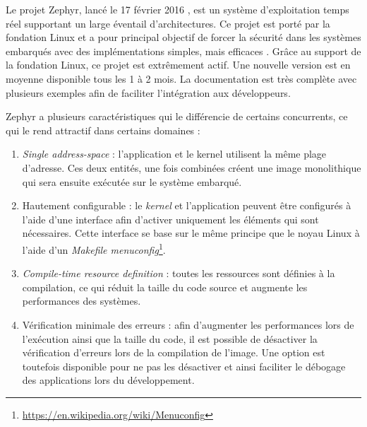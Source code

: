Le projet Zephyr, lancé le 17 février 2016 \cite{Zephyrop38:online}, est un système d'exploitation temps réel supportant un large éventail d'architectures. Ce projet est porté par la fondation Linux et a pour principal objectif de forcer la sécurité dans les systèmes embarqués avec des implémentations simples, mais efficaces \cite{Zephyrop38:online}. Grâce au support de la fondation Linux, ce projet est extrêmement actif. Une nouvelle version est en moyenne disponible tous les 1 à 2 mois. La documentation est très complète avec plusieurs exemples afin de faciliter l'intégration aux développeurs.

Zephyr a plusieurs caractéristiques qui le différencie de certains concurrents, ce qui le rend attractif dans certains domaines : 
\begin{enumerate}
    \item \textit{Single address-space} : l'application et le kernel utilisent la même plage d'adresse. Ces deux entités, une fois combinées créent une image monolithique qui sera ensuite exécutée sur le système embarqué.
    
    \item Hautement configurable : le \textit{kernel} et l'application peuvent être configurés à l'aide d'une interface afin d'activer uniquement les éléments qui sont nécessaires. Cette interface se base sur le même principe que le noyau Linux à l'aide d'un \textit{Makefile menuconfig}\footnote{\url{https://en.wikipedia.org/wiki/Menuconfig}}.
    
    \item \textit{Compile-time resource definition} : toutes les ressources sont définies à la compilation, ce qui réduit la taille du code source et augmente les performances des systèmes.
    
    \item Vérification minimale des erreurs : afin d'augmenter les performances lors de l'exécution ainsi que la taille du code, il est possible de désactiver la vérification d'erreurs lors de la compilation de l'image. Une option est toutefois disponible pour ne pas les désactiver et ainsi faciliter le débogage des applications lors du développement. 
    

\end{enumerate}
